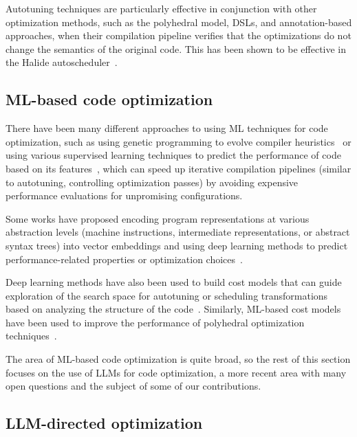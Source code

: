 Autotuning techniques are particularly effective in conjunction with other optimization methods, such as the polyhedral model, DSLs, and annotation-based approaches, when their compilation pipeline verifies that the optimizations do not change the semantics of the original code. This has been shown to be effective in the Halide autoscheduler~\cite{ragan2013halide,adams2019learning}.


\subsection{ML-based code optimization}\label{sec:ml-based-code-optimization}

There have been many different approaches to using ML techniques for code optimization, such as using genetic programming to evolve compiler heuristics~\cite{stephenson2003meta} or using various supervised learning techniques to predict the performance of code based on its features~\cite{ashouri2017micomp,adams2019learning,fursin2011milepost}, which can speed up iterative compilation pipelines (similar to autotuning, controlling optimization passes) by avoiding expensive performance evaluations for unpromising configurations.

Some works have proposed encoding program representations at various abstraction levels (machine instructions, intermediate representations, or abstract syntax trees) into vector embeddings and using deep learning methods to predict performance-related properties or optimization choices~\cite{venkatakeerthy2020ir2vec,mou2016convolutional,ben2018neural}.

Deep learning methods have also been used to build cost models that can guide exploration of the search space for autotuning or scheduling transformations based on analyzing the structure of the code~\cite{baghdadi2021deep,adams2019learning}. Similarly, ML-based cost models have been used to improve the performance of polyhedral optimization techniques~\cite{park2013predictive}.

The area of ML-based code optimization is quite broad, so the rest of this section focuses on the use of LLMs for code optimization, a more recent area with many open questions and the subject of some of our contributions.


\subsection{LLM-directed optimization}\label{sec:llm-directed-optimization}

